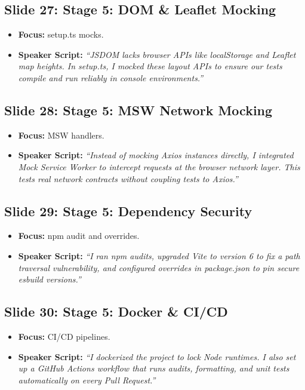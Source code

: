 \documentclass[11pt]{article}
\begin{document}
\subsection{Slide 27: Stage 5: DOM \& Leaflet Mocking}
\begin{itemize}
    \item \textbf{Focus:} setup.ts mocks.
    \item \textbf{Speaker Script:} 
    \textit{``JSDOM lacks browser APIs like localStorage and Leaflet map heights. In setup.ts, I mocked these layout APIs to ensure our tests compile and run reliably in console environments.''}
\end{itemize}

\subsection{Slide 28: Stage 5: MSW Network Mocking}
\begin{itemize}
    \item \textbf{Focus:} MSW handlers.
    \item \textbf{Speaker Script:} 
    \textit{``Instead of mocking Axios instances directly, I integrated Mock Service Worker to intercept requests at the browser network layer. This tests real network contracts without coupling tests to Axios.''}
\end{itemize}

\subsection{Slide 29: Stage 5: Dependency Security}
\begin{itemize}
    \item \textbf{Focus:} npm audit and overrides.
    \item \textbf{Speaker Script:} 
    \textit{``I ran npm audits, upgraded Vite to version 6 to fix a path traversal vulnerability, and configured overrides in package.json to pin secure esbuild versions.''}
\end{itemize}

\subsection{Slide 30: Stage 5: Docker \& CI/CD}
\begin{itemize}
    \item \textbf{Focus:} CI/CD pipelines.
    \item \textbf{Speaker Script:} 
    \textit{``I dockerized the project to lock Node runtimes. I also set up a GitHub Actions workflow that runs audits, formatting, and unit tests automatically on every Pull Request.''}
\end{itemize}
\end{document}
